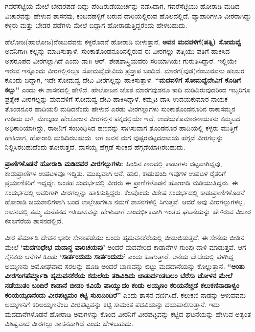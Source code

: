 ಗವರೆಸೆಟ್ಟಿಯ ಮೇಲೆ ಬೇಡರಪಡೆ ಬಿದ್ದು ಪೆಂಡಿರುಡೆಯುರ್ಚನ್ನು ನಡೆಸಿದಾಗ, ಗವರೆಸೆಟ್ಟಿಯು ಹೋರಾಡಿ ಮಡಿದ ವಿಚಾರವನ್ನು ಹೇಳುವ ಶಾಸನವು, ಕಂಬದಹಳ್ಳಿಗೆ ಬರುವ ದಾರಿಯಲ್ಲಿರುವ ಹೊಲದಲ್ಲಿದೆ. ವ್ಯಾಪಾರಿಗಳೂ ವೀರರಾಗಿದ್ದು ಕಳ್ಳರು ಮತ್ತು ಬೇಡರ ಪಡೆಗಳು ಮೇಲೆ ಬಿದ್ದಾಗ ಹೋರಾಡುತ್ತಿದ್ದರೆಂದು ಹೇಳಬಹುದು.

ಹೆಲೋಜ(ಹಾಲೋಜ)ನೆಂಬುವವನು ಕಳ್ಳರೊಡನೆ ಹೋರಾಡಿ ಬೀಳುತ್ತಾನೆ. \textbf{ಅವನ ಮದವಳಿಗೆ(ಪತ್ನಿ) ಸೋಮವ್ವೆ } ಅವನಿಗಾಗಿ ಕಲ್ಲನ್ನು ಮಾಡಿಸುತ್ತಾಳೆ. ಸುಂಕಾತೊಂಡನೂರಿನಲ್ಲಿರುವ ಈ ವೀರಗಲ್ಲು ಪತ್ನಿಯು ಪತಿಗೆ ಹಾಕಿಸಿದ ಅಪರೂಪದ ವೀರಗಲ್ಲಾಗಿದೆ ಎಂದು ಡಾ॥ ಆರ್​. ಶೇಷಶಾಸ್ತ್ರಿಯವರು ಸರಿಯಾಗಿಯೇ ಗುರುತಿಸಿದ್ದಾರೆ. ಇಲ್ಲಿಯೇ ಇರುವ ಇನ್ನೊಂದು ವೀರಗಲ್ಲಿನಲ್ಲೂ ಸೋಮವ್ವೆದೇವಿಯ ಪ್ರಸ್ತಾಪ ಬಂದಿದೆ. ಮಾರಗ(ವುಡ)ನೆಂಬುವವನು ಹಲಬರ ಕೊಂದು ಬಿದ್ದಾಗ, ಇದೇ ಸೋಮವ್ವ ದೇವಿ ವೀರಗಲ್ಲನ್ನು ಹಾಕಿಸುತ್ತಾಳೆ. \textbf{“ಮದವಳಿಗೆ ಸೋಮವ್ವೆದೇವಿಗೆ ಕೊಡಿಗೆ ಕಲ್ಲು”} ಎಂದು ಈ ಶಾಸನದಲ್ಲಿ ಹೇಳಿದೆ. ಹೇಲೋಜನ ಜೊತೆ ಮಾರಗವುಡನೂ ಕಾದಿ ಮಡಿದಿರುವುದರಿಂದ ಇಬ್ಬರಿಗೂ ಪ್ರತ್ಯೇಕ ವೀರಗಲ್ಲನ್ನು ಮದವಳಿಗೆ ಸೋಮವ್ವ ದೇವಿ ಹಾಕಿಸಿದ್ದಾಳೆ. ಕಮ್ಮಟ ದಾಸಿ ಉದಯಕುಮಾರ ನಾಯಕ ತೊಂಡನೂರ ಹಾದಿಯಲಿ ಮಡಿದನೆಂದು ಹೇಳುವ ಎರಡು ವೀರಗಲ್ಲುಗಳು ಸುಂಕಾತೊಂಡನೂರಿನ ರಾಕಾಸಮ್ಮನ ಗುಡಿಯ ಬಳಿ, ಮೇಲ್ಕಂಡ ಹೇಲೋಜನ ವೀರಗಲ್ಲಿನ ಪಕ್ಕದಲ್ಲಿಯೇ ಇವೆ. ಉದೆಯಕೊಮಾರನಾಯಕನು ಕಮ್ಮಟದ ಅಧಿಕಾರಿಯಾಗಿದ್ದು, ರಾಜನಿಗೆ ಸಂಬಂಧಿಸಿದ ಹಣವನ್ನು ಸಾಗಿಸುವಾಗ ತೊಂಡನೂರ ಹಾದಿಯಲ್ಲಿ ಕಳ್ಳರು ಮುತ್ತಿಗೆ ಹಾಕಿದಾಗ, ಹೋರಾಡಿ ಮಡಿದಿರಬಹುದು. ಆಗ ಅವನ ಮಗ ವುಪ್ಪರವಟ್ಟದ\break ದಾಸಯ ಹೆಗ್ಗಡೆ ವೀರಗಲ್ಲನ್ನು ನಿಲ್ಲಿಸಿರಬಹುದೆಂದು ತೋರುತ್ತದೆ. ದಾಸಯ್ಯ ಹೆಗ್ಗಡೆ ಸುಂಕದ ಹೆಗ್ಗಡೆಯಾಗಿರಬಹುದು.

\textbf{ಪ್ರಾಣಿಗಳೊಡನೆ ಹೋರಾಡಿ ಮಡಿದವರ ವೀರಗಲ್ಲುಗಳು:} ಹಿಂದಿನ ಕಾಲದಲ್ಲಿ ಕಾಡುಗಳು ದಟ್ಟವಾಗಿದ್ದವು, ಕಾಡುಪ್ರಾಣಿಗಳ ಉಪಟಳವೂ ಇದ್ದಿತು. ಮುಖ್ಯವಾಗಿ ಆನೆ, ಹುಲಿ, ಕಾಡುಹಂದಿ ಇವುಗಳ ಉಪಟಳ ರೈತರಿಗೆ ಪ್ರಯಾಣಿಕರಿಗೆ ಇದ್ದದ್ದೇ. ಅಂತಹ ಸಂದರ್ಭದಲ್ಲಿ ವೀರರು ಈ ಪ್ರಾಣಿಗಳೊಡನೆ ಹೋರಾಡಿ ಮಡಿಯುತ್ತಿದ್ದರು. ಈ ಸಂದರ್ಭದಲ್ಲಿ ಅವರಿಗಾಗಿ ವೀರಗಲ್ಲನ್ನು ಹಾಕಿಸುತ್ತಿದ್ದರು. ಕೆಲವೊಂದು ವಿಶೇಷ ಸಂದರ್ಭದಲ್ಲಿ ಕಾಡುಪ್ರಾಣಿಗಳೊಡನೆ ಹೋರಾಡಿ ಜಯಶಾಲಿಗಳಾಗಿ ಬಂದ ಉಲ್ಲೇಖಗಳೂ ನಮಗೆ ಶಾಸನಗಳಲ್ಲಿ ಸಿಗುತ್ತವೆ. ಆದರೆ ಅವು ವೀರಗಲ್ಲುಗಳಲ್ಲ. ಶಾಸನದಲ್ಲಿ ತಮ್ಮ ಮನೆತನದ ಇತಿಹಾಸವನ್ನು ಹೇಳುವಾಗ ಸಾಂದರ್ಭಿಕವಾಗಿ ಇಂತಹ ಘಟನೆಯನ್ನು ಹೇಳಿರುವ ವಿಚಾರ ಕಸಲಗೆರೆಯ ಶಾಸನದಲ್ಲಿದೆ.

ವೀರ ಪೆರ್ಮಾಡಿ ದೇವನ ಭಾರೀ ಸೇನಾಪಡೆಯು ಬಂದು ಹೃದುವನಕೆರೆಯಲ್ಲಿ ಬೀಡುಬಿಡುತ್ತದೆ. ಈ ಸೇನೆಯ ಬೀಡಿನ ಮೇಲೆ \textbf{‘ಮದಗಂಧೇಭ ಮದಾನ್ಧ ವಾರಿಚಯವು’} ಅಂದರೆ ಮದವೇರಿದ ಕಾಡಾನೆಗಳ ಗುಂಪು ದಾಳಿ ಮಾಡುತ್ತವೆ. ಆಗ ಸೈನಿಕರು ಆನೆಗಳ ಹಿಂಡು \textbf{‘ಸಾರ್ತಂದುದು ಸಾರ್ತಂದುದು’} ಎಂದು ಕೂಗುತ್ತಾರೆ. ಆನೆಯ ಬೇಟೆಯಲ್ಲಿ ಪಳಗಿದ್ದ ಅಯ್ಕಣನು ಅಮೋಘವಾದ ಸರಲನ್ನು ಹೂಡಿ ಅಂದರೆ ಬಾಣವನ್ನು ಬಿಟ್ಟು ಮದದಾನೆಯನ್ನು ಕೊಲ್ಲುತ್ತಾನೆ.\textbf{ “ಅಂತು ವೀರಗಂಗ\break ಪೆರ್ಮ್ಮಾಡಿ ಹೃದುವನಕೆರೆಯ ಕದುಲೆಯ ತಡಿವಿಡಿದು ಚಾತುರ್ದಂತಬಲಂ ಬೆರೆಸು ಚೋಳನ ಮೇಲೆ ನಡೆಯುತಂ ಬಂದಿರೆ ಕಾಡಾನೆ ಬೀಡಂ ಕವಿಯೆ ಪಾಯ್ವುದಂ ಕಂಡು ಅಯ್ಕಣಂ ಕರಿಯನೆಚ್ಚಡೆ ಕಲುಕಣಿನಾಡಾಳ್ವಂ ಕರಿಯಯ್ಕಣನೆಂದು ವೀರಪಟ್ಟಮಂ ಕಟ್ಟಿ ಸುಖದಿಂದಿರೆ”} ಎಂದು ಶಾಸನ ವರ್ಣಿಸಿದೆ. ಕಲುಕಣಿ ನಾಡನ್ನು ಆಳುವವನು ಅಯ್ಕಣನಿಗೆ ಕರಿಅಯ್ಕಣನೆಂಬ ವೀರಪಟ್ಟವನ್ನು ಕಟ್ಟಿ ಸಾಮಂತ ಪದವಿಯನ್ನು ದಯಪಾಲಿಸುತ್ತಾನೆ. ಇದು ಮದದಾನೆಗಳೊಡನೆ ಹೋರಾಡಿ ಅವುಗಳನ್ನು ಕೊಂದ ವೀರನಿಗೆ ವೀರಪಟ್ಟವನ್ನು ಕಟ್ಟಿದ ಘಟನೆಯನ್ನು ಹೇಳುವ ಅತ್ಯಂತ ವಿಶಿಷ್ಟವಾದ ವೀರಗಲ್ಲು ಶಾಸನವಾಗಿದೆ ಎಂದು ಹೇಳಬಹುದು.

